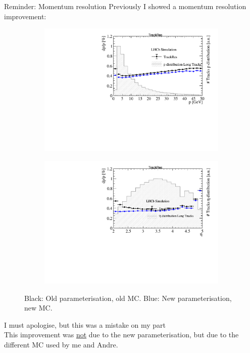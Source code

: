 \documentclass[xcolor={dvipsnames}]{beamer}
\begin{document}
\begin{frame}{Reminder: Momentum resolution}
  \vspace{0.0cm}
  {\Large Previously I showed a momentum resolution improvement:}
  \begin{figure}[htb]
    \centering
    \begin{subfigure}{0.50\textwidth}
      \includegraphics[width=1\textwidth]{Plots/Track_resolution_p_comparison_wrong.pdf}
    \end{subfigure}%
    \begin{subfigure}{0.50\textwidth}
      \includegraphics[width=1\textwidth]{Plots/Track_resolution_eta_comparison_wrong.pdf}
    \end{subfigure}
    \vspace{-0.2cm}
    \caption*{Black: Old parameterisation, old MC. {\color{blue}Blue: New parameterisation, new MC}.}
  \end{figure}
  \vspace{-0.3cm}
  {\Large I must apologise, but this was a mistake on my part\\ \color{red}\large This improvement was \underline{not} due to the new parameterisation, but due to the different MC used by me and Andre.}
\end{frame}
\end{document}
